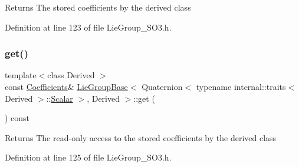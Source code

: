 \begin{DoxyReturn}{Returns}
The stored coefficients by the derived class 
\end{DoxyReturn}


Definition at line 123 of file Lie\+Group\+\_\+\+S\+O3.\+h.

\hypertarget{class_lie_group_base_3_01_quaternion_3_01typename_01internal_1_1traits_3_01_derived_01_4_1_1_scalar_01_4_00_01_derived_01_4_afbf95d4563d6a4d2fc5862fbdaa78603}{}\label{class_lie_group_base_3_01_quaternion_3_01typename_01internal_1_1traits_3_01_derived_01_4_1_1_scalar_01_4_00_01_derived_01_4_afbf95d4563d6a4d2fc5862fbdaa78603} 
\subsubsection{\texorpdfstring{get()}{get()}\hspace{0.1cm}{\footnotesize\ttfamily [2/2]}}
{\footnotesize\ttfamily template$<$class Derived $>$ \\
const \hyperlink{class_lie_group_base_3_01_quaternion_3_01typename_01internal_1_1traits_3_01_derived_01_4_1_1_scalar_01_4_00_01_derived_01_4_a05070964df6c909014295fe81ea2ac44}{Coefficients}\& \hyperlink{class_lie_group_base}{Lie\+Group\+Base}$<$ Quaternion$<$ typename internal\+::traits$<$ Derived $>$\+::\hyperlink{class_lie_group_base_3_01_quaternion_3_01typename_01internal_1_1traits_3_01_derived_01_4_1_1_scalar_01_4_00_01_derived_01_4_afadeceb3b98e52deecc572e71efb82a8}{Scalar} $>$, Derived $>$\+::get (\begin{DoxyParamCaption}{ }\end{DoxyParamCaption}) const\hspace{0.3cm}{\ttfamily [inline]}}

\begin{DoxyReturn}{Returns}
The read-\/only access to the stored coefficients by the derived class 
\end{DoxyReturn}


Definition at line 125 of file Lie\+Group\+\_\+\+S\+O3.\+h.

